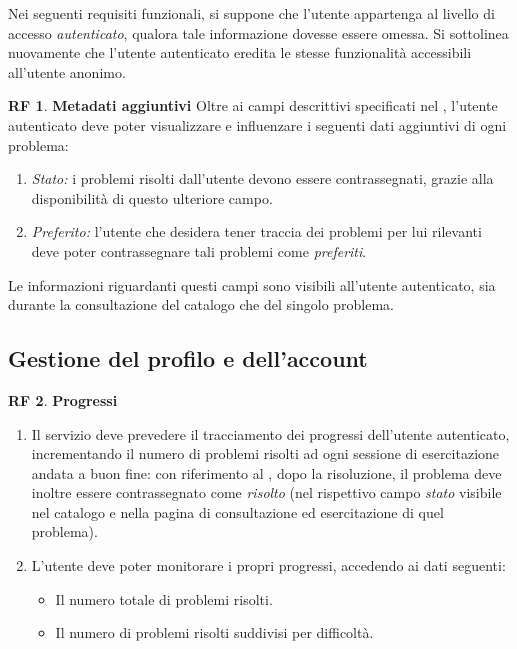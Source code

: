\documentclass[11pt, a4paper]{article}
\theoremstyle{definition}
\newtheorem{funcreq}{RF} %
\begin{document}
Nei seguenti requisiti funzionali, si suppone che l'utente appartenga al livello
di accesso \textit{autenticato}, qualora tale informazione dovesse essere omessa.
Si sottolinea nuovamente che l'utente autenticato eredita le stesse funzionalità
accessibili all'utente anonimo.
\\
\begin{funcreq}
    \textbf{Metadati aggiuntivi }
    Oltre ai campi descrittivi specificati nel \textcolor{blue}{},
    l'utente autenticato deve poter visualizzare e influenzare i seguenti dati aggiuntivi di
    ogni problema:
    \begin{enumerate}
        \item \textit{Stato:} i problemi risolti dall'utente devono essere contrassegnati,
        grazie alla disponibilità di questo ulteriore campo.
    
        \item \textit{Preferito:} l'utente che desidera tener traccia dei problemi
        per lui rilevanti deve poter contrassegnare tali problemi come \textit{preferiti}.
    \end{enumerate}
    Le informazioni riguardanti questi campi sono visibili all'utente autenticato,
    sia durante la consultazione del catalogo che del singolo problema.
\end{funcreq}

\newpage
\subsection{Gestione del profilo e dell'account}
\begin{funcreq}
\label{stats}
\textbf{Progressi }
\begin{enumerate}
    \item Il servizio deve prevedere il tracciamento dei progressi dell'utente
    autenticato, incrementando il numero di problemi risolti ad ogni sessione
    di esercitazione andata a buon fine: con riferimento al
    \textcolor{blue}{},
    dopo la risoluzione, il problema deve inoltre essere contrassegnato come
    \textit{risolto} (nel rispettivo campo \textit{stato} visibile nel catalogo
    e nella pagina di consultazione ed esercitazione di quel problema).

    \item L'utente deve poter monitorare i propri progressi, accedendo ai dati
    seguenti:
    \begin{itemize}
        \item Il numero totale di problemi risolti.
        \item Il numero di problemi risolti suddivisi per difficoltà.
    \end{itemize}
\end{enumerate}
\end{funcreq}
\end{document}
